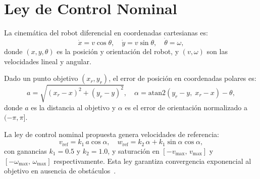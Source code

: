 \section{Ley de Control Nominal}

La cinemática del robot diferencial en coordenadas cartesianas es:
\begin{equation}
  \dot{x} = v\cos\theta, \quad \dot{y} = v\sin\theta, \quad \dot{\theta} = \omega,
  \label{eq:cinematica}
\end{equation}
donde $(x, y, \theta)$ es la posición y orientación del robot, y $(v, \omega)$ son las velocidades lineal y angular.

Dado un punto objetivo $(x_r, y_r)$, el error de posición en coordenadas polares es:
\begin{equation}
  a = \sqrt{(x_r - x)^2 + (y_r - y)^2}, \quad
  \alpha = \text{atan2}(y_r - y,\; x_r - x) - \theta,
  \label{eq:error_polar}
\end{equation}
donde $a$ es la distancia al objetivo y $\alpha$ es el error de orientación normalizado a $(-\pi, \pi]$.

La ley de control nominal propuesta genera velocidades de referencia:
\begin{equation}
  v_{\text{ref}} = k_1\, a\cos\alpha, \quad
  w_{\text{ref}} = k_2\,\alpha + k_1\sin\alpha\cos\alpha,
  \label{eq:ley_control}
\end{equation}
con ganancias $k_1 = 0.5$ y $k_2 = 1.0$, y saturación en $[-v_{\max},\, v_{\max}]$ y $[-\omega_{\max},\, \omega_{\max}]$ respectivamente. Esta ley garantiza convergencia exponencial al objetivo en ausencia de obstáculos~\cite{ramirez2001collision}.
